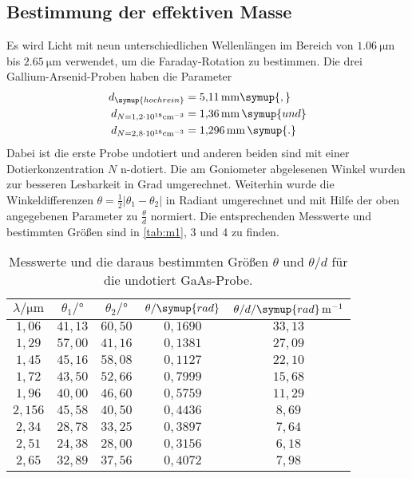 \subsection{Bestimmung der effektiven Masse}
Es wird Licht mit neun unterschiedlichen Wellenlängen im Bereich von $\SI{1,06}{\micro\meter}$ bis
$\SI{2,65}{\micro\meter}$ verwendet, um die Faraday-Rotation zu bestimmen. Die drei Gallium-Arsenid-Proben haben
die Parameter
\begin{align*}
  d_{\symup{hochrein}} &= \SI{5,11}{\milli\meter}\symup{,} \\
  d_{N=1,2 \cdot 10^{18} \si{cm}^{-3}} &= \SI{1,36}{\milli\meter}\,\symup{ und} \\
  d_{N=2,8 \cdot 10^{18} \si{cm}^{-3}} &= \SI{1,296}{\milli\meter}\,\symup{.}
\end{align*}
Dabei ist die erste Probe undotiert und anderen beiden sind mit einer Dotierkonzentration $N$ n-dotiert.
Die am Goniometer abgelesenen Winkel wurden zur besseren Lesbarkeit in Grad umgerechnet. Weiterhin wurde die
Winkeldifferenzen $\theta = \frac{1}{2}|\theta_{1} - \theta_{2}|$ in Radiant umgerechnet und mit Hilfe
der oben angegebenen Parameter zu $\frac{\theta}{d}$ normiert.
Die entsprechenden Messwerte und bestimmten Größen sind in \autoref{tab:m1}, 3 und 4 zu finden.
\begin{table}[hbt!]
  \centering
  \caption{Messwerte und die daraus bestimmten Größen $\theta$ und $\theta/d$ für die undotiert GaAs-Probe.}
  \label{tab:m1}
  \begin{tabular}{c c c c c}
    \toprule
    $\lambda/\si{\micro\meter}$ & $\theta_{1}/\si{\degree}$ & $\theta_{2}/\si{\degree}$ & $\theta/\symup{rad}$ & $\theta/d/\symup{rad}\, \si{m}^{-1}$\\
    \midrule
    $1,06 $ & $41,13$ & $60,50$ & $0,1690$ & $33,13$ \\
    $1,29 $ & $57,00$ & $41,16$ & $0,1381$ & $27,09$ \\
    $1,45 $ & $45,16$ & $58,08$ & $0,1127$ & $22,10$ \\
    $1,72 $ & $43,50$ & $52,66$ & $0,7999$ & $15,68$ \\
    $1,96 $ & $40,00$ & $46,60$ & $0,5759$ & $11,29$ \\
    $2,156$ & $45,58$ & $40,50$ & $0,4436$ & $ 8,69$ \\
    $2,34 $ & $28,78$ & $33,25$ & $0,3897$ & $ 7,64$ \\
    $2,51 $ & $24,38$ & $28,00$ & $0,3156$ & $ 6,18$ \\
    $2,65 $ & $32,89$ & $37,56$ & $0,4072$ & $ 7,98$ \\
    \bottomrule
  \end{tabular}
\end{table}


